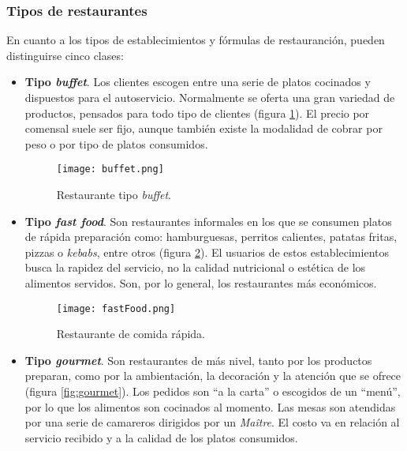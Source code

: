     \subsubsection{Tipos de restaurantes}
  En cuanto a los tipos de establecimientos y fórmulas de restauranción, pueden
  distinguirse cinco clases:
  \begin{itemize}
  \item \textbf{Tipo \emph{buffet}}. Los clientes escogen entre una serie de
  platos cocinados y dispuestos para el autoservicio. Normalmente se oferta
  una gran variedad de productos, pensados para todo tipo de clientes (figura
  \ref{fig:buffet}). El precio por comensal suele ser fijo, aunque también
  existe la modalidad de cobrar por peso o por tipo de platos consumidos.

  \begin{figure}[!h]
    \begin{center}
      \texttt{[image: buffet.png]}
      \caption{Restaurante tipo \emph{buffet}.}
      \label{fig:buffet}
    \end{center}
  \end{figure}

  \item \textbf{Tipo \emph{fast food}}. Son restaurantes informales en los que
  se consumen platos de rápida preparación como: hamburguesas, perritos
  calientes, patatas fritas, pizzas o \emph{kebabs}, entre otros (figura
  \ref{fig:fastFood}). El usuarios de estos establecimientos busca la rapidez 
  del servicio, no la calidad nutricional o estética de los alimentos 
  servidos. Son, por lo general, los restaurantes más económicos.

  \begin{figure}[!h]
    \begin{center}
      \texttt{[image: fastFood.png]}
      \caption{Restaurante de comida rápida.}
      \label{fig:fastFood}
    \end{center}
  \end{figure}

  \item \textbf{Tipo \emph{gourmet}}. Son restaurantes de más nivel, tanto por
  los productos preparan, como por la ambientación, la decoración y la atención
  que se ofrece (figura \ref{fig:gourmet}). Los pedidos son ``a la carta'' o
  escogidos de un ``menú'', por lo que los alimentos son cocinados al momento.
  Las mesas son atendidas por una serie de camareros dirigidos por un
  \emph{Maître}. El costo va en relación al servicio recibido y a la calidad de
  los platos consumidos.


\end{itemize}
